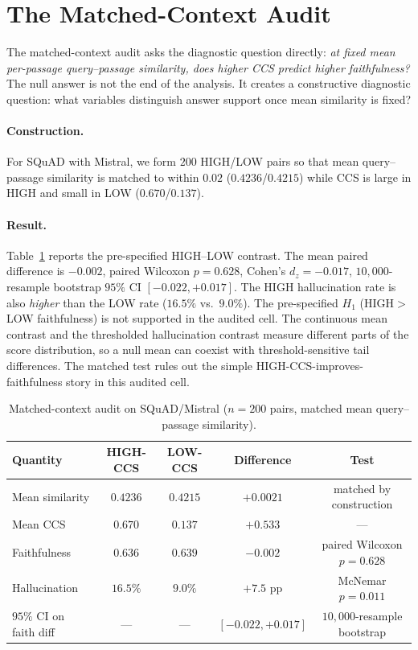 \section{The Matched-Context Audit}
\label{sec:matched_ccs}

The matched-context audit asks the diagnostic question directly:
\emph{at fixed mean per-passage query--passage similarity, does higher
CCS predict higher faithfulness?} The null answer is not the end of the
analysis. It creates a constructive diagnostic question: what variables
distinguish answer support once mean similarity is fixed?

\paragraph{Construction.} For SQuAD with Mistral, we form $200$
HIGH/LOW pairs so that mean query--passage similarity is matched to
within $0.02$ ($0.4236$/$0.4215$) while CCS is large in HIGH and small
in LOW ($0.670$/$0.137$).

\paragraph{Result.} Table~\ref{tab:matched_ccs_main} reports the
pre-specified HIGH--LOW contrast. The mean paired difference is
$-0.002$, paired Wilcoxon $p = 0.628$, Cohen's $d_z = -0.017$,
$10{,}000$-resample bootstrap $95\%$ CI $[-0.022, +0.017]$. The HIGH
hallucination rate is also \emph{higher} than the LOW rate
($16.5\%$ vs.\ $9.0\%$). The pre-specified $H_1$
(HIGH$>$LOW faithfulness) is not supported in the audited cell. The
continuous mean contrast and the thresholded hallucination contrast
measure different parts of the score distribution, so a null mean can
coexist with threshold-sensitive tail differences. The matched test
rules out the simple HIGH-CCS-improves-faithfulness story in this
audited cell.

\begin{table}[!htb]
\centering
\caption{Matched-context audit on SQuAD/Mistral ($n{=}200$ pairs,
matched mean query--passage similarity).}
\label{tab:matched_ccs_main}
\footnotesize
\begin{tabular}{lcccc}
\toprule
Quantity & HIGH-CCS & LOW-CCS & Difference & Test \\
\midrule
Mean similarity & $0.4236$ & $0.4215$ & $+0.0021$ & matched by construction \\
Mean CCS        & $0.670$  & $0.137$  & $+0.533$  & --- \\
Faithfulness    & $0.636$  & $0.639$  & $-0.002$  & paired Wilcoxon $p=0.628$ \\
Hallucination   & $16.5\%$ & $9.0\%$  & $+7.5$ pp & McNemar $p=0.011$ \\
$95\%$ CI on faith diff & --- & --- & $[-0.022, +0.017]$ & $10{,}000$-resample bootstrap \\
\bottomrule
\end{tabular}
\end{table}

